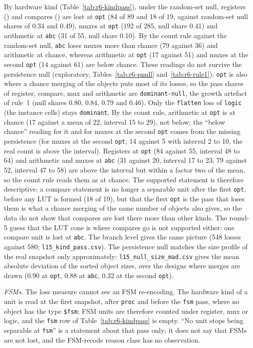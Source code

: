 \documentclass[conference]{IEEEtran}
\newcommand{\code}[1]{\texttt{#1}}
\begin{document}
By hardware kind (Table~\ref{tab:r6-kindpass}), under the random-set null, registers
(\rsxRoneRegister) and compares (\rsxRoneCompare) are lost at \code{opt} (84 of 89 and 18 of 19,
against random-set null shares of 0.34 and 0.49), muxes at \code{opt} (192 of 285, null share 0.41)
and arithmetic at \code{abc} (31 of 55, null share 0.10). By the count rule against the random-set
null, \code{abc} loses muxes more than chance (79 against 36) and arithmetic at chance, whereas
arithmetic at \code{opt} (17 against 51) and muxes at the second \code{opt} (14 against 61) are
below chance. These readings do not survive the persistence null (exploratory,
Tables~\ref{tab:r6-pnull} and~\ref{tab:r6-rule1}): \code{opt} is also where a chance merging of
the objects puts most of its losses, so the pass shares of register, compare, mux and arithmetic are
\code{dominant-null}, the growth artefact of rule~1 (null shares 0.80, 0.84, 0.79 and 0.46). Only
the \code{flatten} loss of \code{logic} (the instance cells) stays \code{dominant}. By the count
rule, arithmetic at \code{opt} is at chance (17 against a mean of 22, interval 15 to 29), not below;
the ``below chance'' reading for it and for muxes at the second \code{opt} comes from the missing
persistence (for muxes at the second \code{opt}, 14 against 5 with interval 2 to 10, the real count
is above the interval). Registers at \code{opt} (84 against 55, interval 48 to 64) and arithmetic and
muxes at \code{abc} (31 against 20, interval 17 to 23; 79 against 52, interval 47 to 58) are above
the interval but within a factor two of the mean, so the count rule reads them as at chance. The
supported statement is therefore descriptive: a compare statement is no longer a separable unit
after the first \code{opt}, before any LUT is formed (18 of 19), but that the first \code{opt} is the
pass that loses them is what a chance merging of the same number of objects also gives, so the data
do not show that compares are lost there more than other kinds. The round-5 guess that the LUT cone
is where compares go is not supported either: one compare unit is lost at \code{abc}. The branch level
gives the same picture (548 losses against 580; \code{l15\_kind\_pass.csv}). The persistence null
matches the size profile of the real snapshot only approximately: \code{l15\_null\_size\_mad.csv}
gives the mean absolute deviation of the sorted object sizes, over the designs where merges are
drawn (0.90 at \code{opt}, 0.88 at \code{abc}, 0.32 at the second \code{opt}).

\emph{FSMs.} The loss measure cannot see an FSM re-encoding. The hardware kind of a unit is read
at the first snapshot, after \code{proc} and before the \code{fsm} pass, where no object has the
type \code{\$fsm}; FSM units are therefore counted under register, mux or logic, and the \code{fsm}
row of Table~\ref{tab:r6-kindpass} is empty. ``No unit stops being separable at \code{fsm}'' is a
statement about that pass only; it does not say that FSMs are not lost, and the FSM-recode reason
class has no observation.
\end{document}
